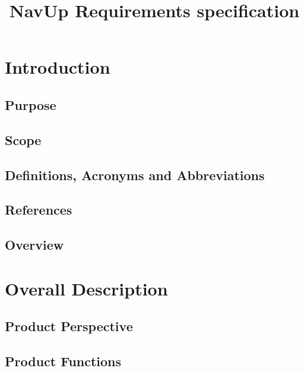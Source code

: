 \documentclass{article}
\begin{document}
\title{NavUp Requirements specification}
\maketitle
\newpage
{\let\cleardoublepage\clearpage 
\maketitle
\tableofcontents
}
\section{Introduction}
	\subsection{Purpose}
	

	\subsection{Scope}
	
	
	\subsection{Definitions, Acronyms and Abbreviations}
	
	
	\subsection{References}
	
	
	\subsection{Overview}
	
	
\section{Overall Description}
	\subsection{Product Perspective}
	

	\subsection{Product Functions}
	
	
\end{document}
